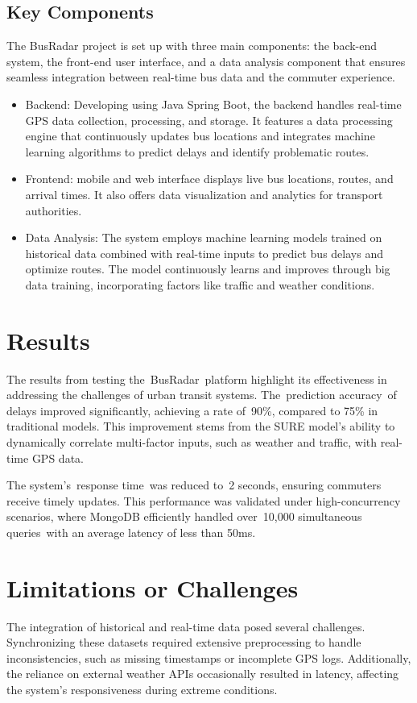 \documentclass[conference]{IEEEtran}
\begin{document}
\subsection{Key Components}
The BusRadar project is set up with three main components: the back-end system, the front-end user interface, and a data analysis component that ensures seamless integration between real-time bus data and the commuter experience.  
\begin{itemize}
    \item Backend: Developing using Java Spring Boot, the backend handles real-time GPS data collection, processing, and storage. It features a data processing engine that continuously updates bus locations and integrates machine learning algorithms to predict delays and identify problematic routes.
    \item Frontend: mobile and web interface displays live bus locations, routes, and arrival times. It also offers data visualization and analytics for transport authorities.
    \item Data Analysis: The system employs machine learning models trained on historical data combined with real-time inputs to predict bus delays and optimize routes. The model continuously learns and improves through big data training, incorporating factors like traffic and weather conditions.
\end{itemize}

\section{Results}
The results from testing the BusRadar platform highlight its effectiveness in addressing the challenges of urban transit systems. The prediction accuracy of delays improved significantly, achieving a rate of 90\%, compared to 75\% in traditional models. This improvement stems from the SURE model's ability to dynamically correlate multi-factor inputs, such as weather and traffic, with real-time GPS data. 

The system's response time was reduced to 2 seconds, ensuring commuters receive timely updates. This performance was validated under high-concurrency scenarios, where MongoDB efficiently handled over 10,000 simultaneous queries with an average latency of less than 50ms. 

\section{Limitations or Challenges}
The integration of historical and real-time data posed several challenges. Synchronizing these datasets required extensive preprocessing to handle inconsistencies, such as missing timestamps or incomplete GPS logs. Additionally, the reliance on external weather APIs occasionally resulted in latency, affecting the system’s responsiveness during extreme conditions. 
\end{document}
